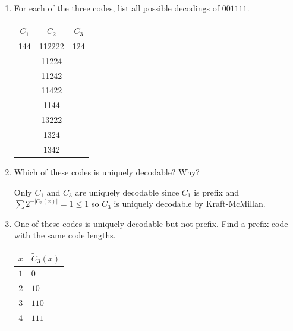 \documentclass[11pt]{report}
\newcommand{\abs}[1]{\left\vert #1 \right\vert}
\begin{document}
\begin{enumerate}[1.]
          \begin{enumerate}
              \item For each of the three codes, list all possible decodings of $001111$.

                    \color{blue}
                    \qquad \begin{tabular}{ccc}
                        $C_1$ & $C_2$  & $C_3$ \\\hline
                        144   & 112222 & 124   \\
                              & 11224          \\
                              & 11242          \\
                              & 11422          \\
                              & 1144           \\
                              & 13222          \\
                              & 1324           \\
                              & 1342           \\\hline
                    \end{tabular}
                    \color{black}

              \item Which of these codes is uniquely decodable? Why?

                    \color{blue}
                    Only $C_1$ and $C_3$ are uniquely decodable since $C_1$ is prefix and $\sum 2^{-\abs{C_3(x)}} = 1 \leq 1$ so $C_3$ is uniquely decodable by Kraft-McMillan.
                    \color{black}

              \item One of these codes is uniquely decodable but not prefix. Find a prefix code with the same code lengths.

                    \color{blue}
                    \qquad \begin{tabular}{c|l}
                        $x$ & $\tilde{C}_3(x)$ \\ \hline
                        $1$ & $0$              \\
                        $2$ & $10$             \\
                        $3$ & $110$            \\
                        $4$ & $111$
                    \end{tabular}


\end{enumerate}
\end{enumerate}
\end{document}
